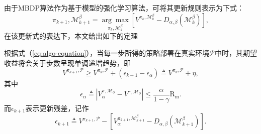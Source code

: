 由于MBDP算法作为基于模型的强化学习算法，可将其更新规则表示为下式：
\begin{equation}
    \pi_{k+1}, \mathcal{M}^\beta_{k+1}=\underset{\pi_k, \mathcal{M}_k^\beta}{\arg\max}\left[{V}^{\pi_k, \mathcal{M}_k^\beta}-D_{\alpha,\beta}(\mathcal{M}^\beta_k)\right],
\label{eq:algo-equation}
\end{equation}
在该更新式的表达下，本文给出如下的定理
\begin{theorem}
根据式（\ref{eq:algo-equation}），当每一步所得的策略部署在真实环境$\mathcal{P}$中时，其期望收益将会关于步数呈现单调递增趋势，即
\begin{equation}
    {V}^{\pi_{k+1}, \mathcal{P}}\geq {V}^{\pi_{k}, \mathcal{P}} + (\epsilon_{k+1} - \epsilon_\alpha) \triangleq {V}^{\pi_{k}, \mathcal{P}} + \eta,
\end{equation}
其中
\begin{equation}
    \epsilon_\alpha \triangleq |{V}_\alpha^{\pi, \mathcal{M}_{\phi}} - {V}^{\pi,\mathcal{M}_{\phi}}|   \leq \frac{\alpha}{1-\gamma}\mathrm{R_{m}}.
\end{equation}
而$\epsilon_{k+1}$表示更新残差，记作
\begin{equation}
    \epsilon_{k+1} \triangleq {V}^{\pi_{k+1}, \mathcal{P}} - \left[{V}_{\alpha}^{\pi_{k+1}, \mathcal{M}_{k+1}^\beta} - D_{\alpha,\beta}(\mathcal{M}_{k+1}^\beta)\right].
\end{equation}
\label{prop:performance}
\end{theorem}

